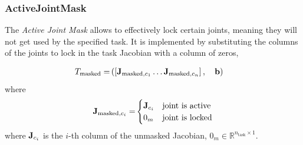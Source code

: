 \subsubsection{ActiveJointMask}
The \emph{Active Joint Mask} allows to effectively lock certain joints, meaning they will not get used by the specified task. It is implemented by substituting the columns of the joints to lock in the task Jacobian with a column of zeros, 

\begin{eqnarray}
T_\text{masked} = & \left( \left[ \mathbf{J}_{\text{masked},c_1} \dotsc \mathbf{J}_{\text{masked},c_n} \right], \quad \mathbf{b} \right)
\end{eqnarray}
where
\begin{equation*}
{\mathbf{J}_{\text{masked},c_i}=}
\begin{cases}
\mathbf{J}_{c_i} & \text{joint is active}\\
0_m & \text{joint is locked}
\end{cases}
\end{equation*}
 where $\mathbf{J}_{c_i}$ is the $i$-th column of the unmasked Jacobian, $0_m \in \mathbb{R}^{n_\text{task} \times 1}$.


